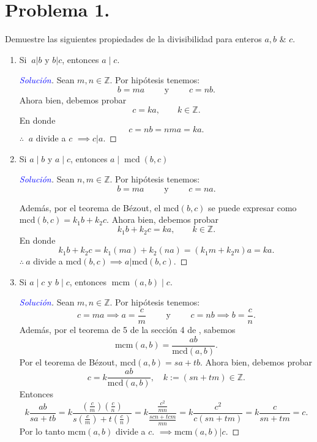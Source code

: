 \documentclass[a4paper,12pt]{article}
\newenvironment{solution}
  {\renewcommand\qedsymbol{$\square$}\begin{proof}[\textcolor{blue}{Solución}]}
  {\end{proof}}
\begin{document}
\section{Problema 1.}  Demuestre las siguientes propiedades de la divisibilidad para enteros $a, b$ \& $c$.
\begin{enumerate}[label=\alph*.]
\item Si $\ a|b$ y $ b| c$, entonces $a \mid c$.
\begin{solution}
	Sean $m,n\in\mathbb{Z}$. Por hipótesis tenemos: 
	$$b=ma\qquad \text{ y } \qquad c = nb.$$
 	Ahora bien, debemos probar
 	$$c=ka,\qquad k\in\mathbb{Z}.$$ 
En donde $$c=nb=nma=ka. $$
$\therefore \ $  $a$ divide a $c$ $\implies c | a$. 
 \end{solution}

\item  Si $a \mid b$ y $a \mid c$, entonces $a \mid \operatorname{mcd}(b, c)$

\begin{solution}
	Sean $n,m\in\mathbb{Z}$.  Por hipótesis tenemos: 
	$$b=ma \qquad \text{ y } \qquad c=na.$$
	
	Además, por el teorema de Bézout, el mcd$(b,c)$ se puede expresar como $\text{mcd}(b,c)=k_1b+k_2c$. Ahora bien, debemos probar
	$$k_1b+k_2c=ka, \qquad k\in\mathbb{Z}.$$
	En donde
	$$k_1b+k_2c=k_1(ma)+k_2(na)=(k_1m+k_2n)a=ka.$$
	$\therefore \ a$ divide a $\text{mcd}(b,c) \implies a |\text{mcd}(b,c) $. 
\end{solution}


\item  Si $a \mid c$ y $b \mid c$, entonces $\operatorname{mcm}(a, b) \mid c$.
\begin{solution}
	Sean $m,n\in\mathbb{Z}$.  Por hipótesis tenemos: 
	$$c=ma\implies a=\frac{c}{m} \qquad \text{ y }\qquad  c=nb\implies b=\frac{c}{n}.$$	
	Además, por el teorema de 5 de la sección 4 de \cite{rosen2012discrete}, sabemos  
	$$\text{mcm}(a,b)=\frac{ab}{\text{mcd}(a,b)}.$$
	Por el teorema de Bézout, mcd$(a,b)=sa+tb$. Ahora bien, debemos probar
	$$c=k\frac{ab}{\text{mcd}(a,b)}, \quad k:=(sn+tm) \in\mathbb{Z}. $$
	Entonces 
	$$k\frac{ab}{sa+tb}=k\frac{\left(\frac{c}{m}\right)\left(\frac{c}{n}\right)}{s\left(\frac{c}{m}\right)+t\left(\frac{c}{n}\right)}=k\frac{\frac{c^2}{mn}}{\frac{scn+tcm}{mn}}=k\frac{c^2}{c(sn+tm)}=k\frac{c}{sn+tm}=c.$$
	Por lo tanto $\text{mcm}(a,b)$ divide a $c$. $\implies\text{mcm}(a,b)|c$.
\end{solution}
\end{enumerate}
\end{document}
